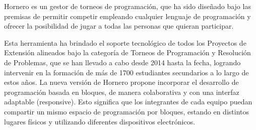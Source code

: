 \documentclass{articleteyet}
\begin{document}
Hornero es un gestor de torneos de programación, que ha sido diseñado bajo las premisas de permitir competir empleando cualquier lenguaje de programación y ofrecer la posibilidad de jugar a todas las personas que quieran participar. 



Esta herramienta ha brindado el soporte tecnológico de todos los Proyectos de Extensión alineados bajo la categoría de Torneos de Programación y Resolución de Problemas, que se han llevado a cabo desde 2014 hasta la fecha, logrando intervenir en la formación de más de 1700 estudiantes secundarios a lo largo de estos años. 
La nueva versión de Hornero propone incorporar el desarrollo de programación basada en bloques, de manera colaborativa y con una interfaz adaptable (responsive). Esto significa que los integrantes de cada equipo puedan compartir un mismo espacio de programación por bloques, estando en distintos lugares físicos y utilizando diferentes dispositivos electrónicos. 








\end{document}
